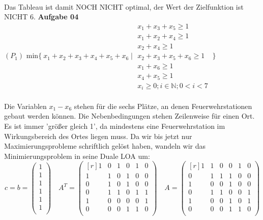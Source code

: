 \documentclass[a4paper,10pt]{article}
\begin{document}
	\\
	Das Tableau ist damit NOCH NICHT optimal, der Wert der Zielfunktion ist NICHT 6.
	\newpage
	\textbf{Aufgabe 04}\\
	$(P_1) \text{ min} \{\ x_1+x_2+x_3+x_4+x_5+x_6 \mid 
	\begin{matrix}
		x_1 + x_3 + x_5 \geq 1\\
		x_1 + x_2 + x_4 \geq 1\\
		x_2 + x_4 \geq 1\\
		x_2 + x_3 + x_5 + x_6 \geq 1\\
		x_1 + x_6 \geq 1\\
		x_4 + x_5 \geq 1 \\
		x_i \geq 0; i\in \mathbb{N}; 0<i<7
	\end{matrix}
	\ \}$
	\\\\
	Die Variablen $ x_1 - x_6 $ stehen für die sechs Plätze, an denen Feuerwehrstationen gebaut werden können. Die Nebenbedingungen stehen Zeilenweise für einen Ort. Es ist immer 'größer gleich 1', da mindestens eine Feuerwehrstation im Wirkungsbereich des Ortes liegen muss. Da wir bis jetzt nur Maximierungsprobleme schriftlich gelöst haben, wandeln wir das Minimierungsproblem in seine Duale LOA um:
	\[
	c = b = 
	\begin{pmatrix}
		1\\
		1\\
		1\\
		1\\
		1\\
		1\\
	\end{pmatrix}
	\quad
	A^T =
	\begin{pmatrix*}[r]
		1 & 0 & 1 & 0 & 1 & 0\\
		1 & 1 & 0 & 1 & 0 & 0\\
		0 & 1 & 0 & 1 & 0 & 0\\
		0 & 1 & 1 & 0 & 1 & 1\\
		1 & 0 & 0 & 0 & 0 & 1\\
		0 & 0 & 0 & 1 & 1 & 0\\
	\end{pmatrix*}
	\quad
	A = 
	\begin{pmatrix*}[r]
		1 & 1 & 0 & 0 & 1 & 0\\
		0 & 1 & 1 & 1 & 0 & 0\\
		1 & 0 & 0 & 1 & 0 & 0\\
		0 & 1 & 1 & 0 & 0 & 1\\
		1 & 0 & 0 & 1 & 0 & 1\\
		0 & 0 & 0 & 1 & 1 & 0\\
	\end{pmatrix*}
	\] \\
\end{document}
